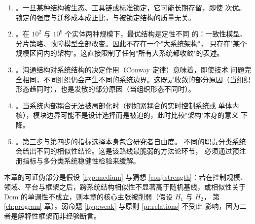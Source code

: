 \begin{enumerate}[label=(\alph*)]
\item {}。一旦某种结构被生态、工具链或标准锁定，它可能长期存留，即使
      次优。锁定的强度与迁移成本成正比，与被锁定结构的质量无关。
\item {}。在 $10^{2}$ 与 $10^{9}$ 个实体两种规模下，最优结构是定性不同
      的：一致性模型、分片策略、故障模型全部改变。因此不存在一个"大系统架构"，
      只存在"某个规模区间内的架构"。这直接限制了任何"所有大系统都收敛"的表述。
\item {}。沟通结构对系统结构的决定作用（Conway 定律）意味着，即使技术
      问题完全相同，不同组织仍会产生不同的系统边界。这既是收敛的部分原因（当组织
      形态趋同时），也是发散的部分原因（当组织形态不同时）。
\item {}。当系统内部耦合无法被局部化时（例如紧耦合的实时控制系统或
      单体内核），模块边界可能不是设计选择而是被迫的，此时比较"架构"本身的意义
      下降。
\item {}。第三步与第四步的指标选择本身包含研究者自由度。
      不同的职责分类系统会给出不同的相似性结论。这是该路线最脆弱的方法论环节，
      必须通过预注册指标与多分类系统稳健性检验来缓解。
\end{enumerate}

本章的可证伪部分是假设 \ref{hyp:medium} 与猜想 \ref{conj:strength}：若在控制规模、
领域、平台与框架之后，跨系统结构相似性不显著高于随机基线，或相似性关于
$\mathrm{Dom}$ 的单调性不成立，则本章的核心主张被削弱（假设 $H_1$ 与 $H_2$，
第 \ref{ch:program} 章）。弱命题 \ref{hyp:weak} 与原则 \ref{pr:relations} 不受此
影响，因为二者是解释性框架而非经验断言。
